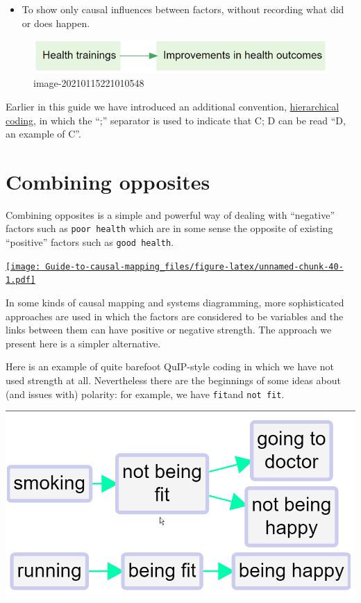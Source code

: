 \documentclass[
]{book}
\providecommand{\tightlist}{%
  \setlength{\itemsep}{0pt}\setlength{\parskip}{0pt}}
\begin{document}
\begin{itemize}
\tightlist
\item
  To show only causal influences between factors, without recording what did or does happen.
\end{itemize}

\begin{figure}
\centering
\includegraphics{_assets/image-20210115221010548.png}
\caption{image-20210115221010548}
\end{figure}

Earlier in this guide we have introduced an additional convention, \protect\hyperlink{xhierarchical-coding}{hierarchical coding}, in which the ``;'' separator is used to indicate that C; D can be read ``D, an example of C''.

\hypertarget{combining-opposites}{%
\section{Combining opposites}\label{combining-opposites}}

Combining opposites is a simple and powerful way of dealing with ``negative'' factors such as \texttt{poor\ health} which are in some sense the opposite of existing ``positive'' factors such as \texttt{good\ health}.

\href{https://player.vimeo.com/video/636997200}{\texttt{[image: Guide-to-causal-mapping\_files/figure-latex/unnamed-chunk-40-1.pdf]}}

In some kinds of causal mapping and systems diagramming, more sophisticated approaches are used in which the factors are considered to be variables and the links between them can have positive or negative strength. The approach we present here is a simpler alternative.

Here is an example of quite barefoot QuIP-style coding in which we have not used strength at all. Nevertheless there are the beginnings of some ideas about (and issues with) polarity: for example, we have \texttt{fit}and \texttt{not\ fit}.

\includegraphics[width=6.77083in,height=\textheight]{_assets/121006.png}
\end{document}
